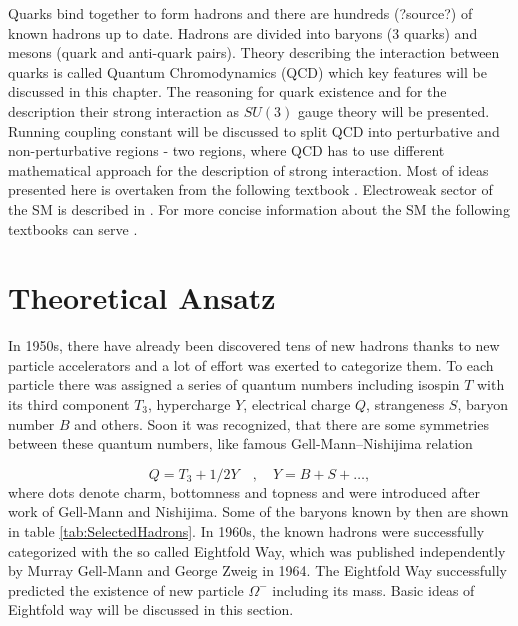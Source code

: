 Quarks bind together to form hadrons and there are hundreds (?source?) of known
hadrons up to date. Hadrons are divided into baryons (3 quarks) and mesons
(quark and anti-quark pairs). Theory describing the interaction between quarks is called
Quantum Chromodynamics (QCD) which key features will be discussed in this
chapter. The reasoning for quark existence and for the description their strong
interaction as $SU(3)$ gauge theory will be presented. Running coupling constant
will be discussed to split QCD into perturbative and non-perturbative regions -
two regions, where QCD has to use different mathematical approach for the description of
strong interaction. Most of ideas presented here is overtaken from the following
textbook \cite{QCDTextbook}. Electroweak sector of the SM is described in
\cite{horejsi2002fundamentals}. For more concise information about the SM the
following textbooks can serve
\cite{griffiths2008introduction,cottingham2007introduction}.

\section{Theoretical Ansatz}
\label{Sec:TheoreticalAnsatz}

In 1950s, there have already been discovered tens of new hadrons thanks to new
particle accelerators and a lot of effort was exerted to categorize them. To each
particle there was assigned a series of quantum numbers
including isospin $T$ with its third component $T_3$, hypercharge $Y$,
electrical charge $Q$, strangeness $S$, baryon number $B$ and others. Soon it
was recognized, that there are some symmetries between these quantum numbers,
like famous Gell-Mann--Nishijima relation
\cite{GellMannNishijima1,GellMannNishijima2}

\begin{equation}
  Q = T_3 + 1/2 Y \quad , \quad Y = B + S + \dots,
  \label{ex:GellMannNishijima}
\end{equation}
where dots denote charm, bottomness and topness and were introduced after work
of Gell-Mann and Nishijima. Some of the baryons known by then are shown in table
\ref{tab:SelectedHadrons}. In 1960s, the known hadrons were successfully
categorized with the so called Eightfold Way, which was published independently
by Murray Gell-Mann \cite{Gell-Mann:101798} and George Zweig \cite{Zweig:570209}
in 1964. The Eightfold Way successfully predicted the existence of new particle
$\Omega^{-}$ including its mass. Basic ideas of Eightfold way will be discussed
in this section.

